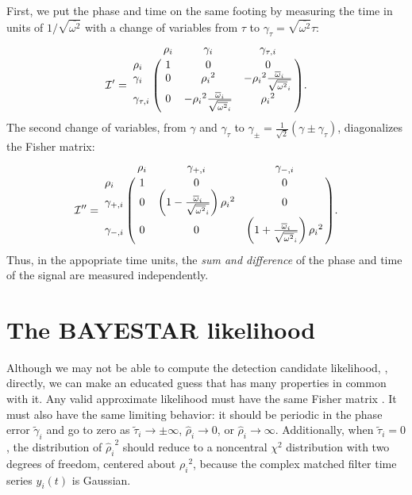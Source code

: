 \documentclass{iopart}
\begin{document}
First, we put the phase and time on the same footing by measuring the time in units of $1 / \sqrt{\overline{\omega^2}}$ with a change of variables from $\tau$ to $\gamma_\tau = \sqrt{\overline{\omega^2}} \tau$:
%
\begin{equation}
    \mathcal{I}' = \bordermatrix{
        ~ & \rho_i & \gamma_i & \gamma_{\tau,i} \cr
        \rho_i & 1 & 0 & 0 \cr
        \gamma_i & 0 & {\rho_i}^2 & -{\rho_i}^2\frac{{\overline{\omega}}_i}{\sqrt{{\overline{\omega^2}}_i}} \cr
        \gamma_{\tau,i} & 0 & -{\rho_i}^2\frac{{\overline{\omega}}_i}{\sqrt{{\overline{\omega^2}}_i}} & {\rho_i}^2
    }.
\end{equation}
%
The second change of variables, from $\gamma$ and $\gamma_\tau$ to $\gamma_\pm = \frac{1}{\sqrt{2}}(\gamma \pm \gamma_\tau)$, diagonalizes the Fisher matrix:
%
\begin{equation}\label{eq:fisher-matrix-extrinsic-one-detector}
    \mathcal{I}'' = \bordermatrix{
        ~ & \rho_i & \gamma_{+,i} & \gamma_{-,i} \cr
        \rho_i & 1 & 0 & 0 \cr
        \gamma_{+,i} & 0 & \left(1 - \frac{\overline{\omega}_i}{\sqrt{\overline{\omega^2}_i}}\right){\rho_i}^2 & 0 \cr
        \gamma_{-,i} & 0 & 0 & \left(1 + \frac{\overline{\omega}_i}{\sqrt{\overline{\omega^2}_i}}\right){\rho_i}^2
    }.
\end{equation}
%
Thus, in the appopriate time units, the \textit{sum and difference} of the phase and time of the signal are measured independently.

\section{The \ac{BAYESTAR} likelihood}

Although we may not be able to compute the detection candidate likelihood, , directly, we can make an educated guess that has many properties in common with it. Any valid approximate likelihood must have the same Fisher matrix . It must also have the same limiting behavior: it should be periodic in the phase error $\tilde{\gamma}_i$ and go to zero as $\tilde{\tau}_i \rightarrow \pm \infty$, $\hat{\rho}_i \rightarrow 0$, or $\hat{\rho}_i \rightarrow \infty$. Additionally, when $\tilde{\tau}_i = 0$, the distribution of ${\hat{\rho}_i}^2$ should reduce to a noncentral $\chi^2$ distribution with two degrees of freedom, centered about ${\rho_i}^2$, because the complex matched filter time series $y_i(t)$ is Gaussian.
\end{document}
